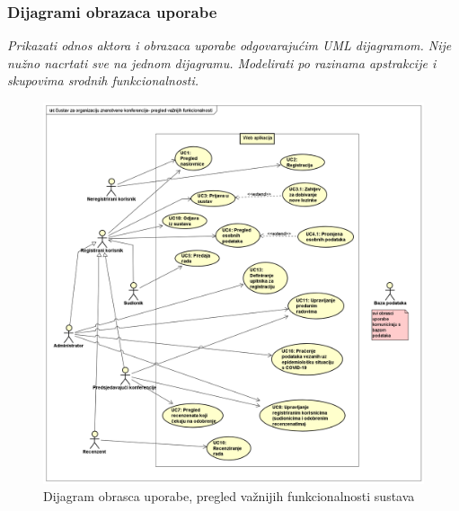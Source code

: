 					
					
					
				
					
				\subsubsection{Dijagrami obrazaca uporabe}
					
					\textit{Prikazati odnos aktora i obrazaca uporabe odgovarajućim UML dijagramom. Nije nužno nacrtati sve na jednom dijagramu. Modelirati po razinama apstrakcije i skupovima srodnih funkcionalnosti.}
					\begin{figure}[H]
						\includegraphics[scale=0.35]{dijagrami/pregledvaznijihfunkcionalnosti.png} 
						\centering
						\caption{Dijagram obrasca uporabe, pregled važnijih funkcionalnosti sustava}
						\label{fig:dijagramobrascauporabe1}
					\end{figure}
